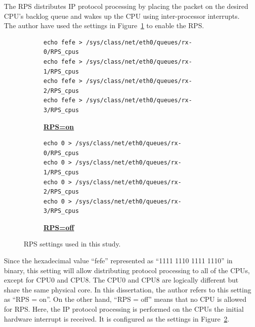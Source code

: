 The RPS distributes IP protocol processing by placing the packet
on the desired CPU's backlog queue and wakes up the CPU using inter-processor interrupts.
The author have used the settings in Figure~\ref{fig:rps=on} to enable the RPS.

\begin{figure}[h]

  \begin{subfigure}[t]{\columnwidth}
    \centering
    \begin{minipage}{0.9\columnwidth}
\begin{verbatim}
echo fefe > /sys/class/net/eth0/queues/rx-0/RPS_cpus
echo fefe > /sys/class/net/eth0/queues/rx-1/RPS_cpus
echo fefe > /sys/class/net/eth0/queues/rx-2/RPS_cpus
echo fefe > /sys/class/net/eth0/queues/rx-3/RPS_cpus
\end{verbatim}
    \end{minipage}
    \caption{\underline{\textbf{RPS=on}}}
    \label{fig:rps=on}
  \end{subfigure}

  \par\bigskip

  \begin{subfigure}[t]{\columnwidth}
    \centering
    \begin{minipage}{0.9\columnwidth}
\begin{verbatim}
echo 0 > /sys/class/net/eth0/queues/rx-0/RPS_cpus
echo 0 > /sys/class/net/eth0/queues/rx-1/RPS_cpus
echo 0 > /sys/class/net/eth0/queues/rx-2/RPS_cpus
echo 0 > /sys/class/net/eth0/queues/rx-3/RPS_cpus
\end{verbatim}
    \end{minipage}
    \caption{\underline{\textbf{RPS=off}}}
    \label{fig:rps=off}
  \end{subfigure}

  \par\bigskip
  \centering
  \begin{minipage}{0.9\columnwidth}
    \caption[RPS settings]{
      RPS settings used in this study.
    }
    \label{fig:rps_settings}
  \end{minipage}

  \par\bigskip
\end{figure}

Since the hexadecimal value \enquote{fefe} represented as \enquote{1111 1110 1111 1110} in binary, 
this setting will allow distributing protocol processing to all of the CPUs, except for CPU0 and CPU8.
The CPU0 and CPU8 are logically different but share the same physical core.
In this dissertation, the author refers to this setting as \enquote{RPS = on}.
%
On the other hand, \enquote{RPS = off} means that no CPU is allowed for RPS. 
Here, the IP protocol processing is performed on the CPUs the initial hardware interrupt is received.
It is configured as the settings in Figure~\ref{fig:rps=off}.

